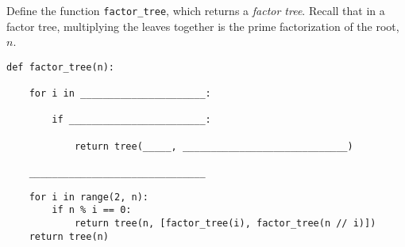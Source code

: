 \begin{blocksection}
\question Define the function \lstinline{factor_tree}, which returns a \emph{factor tree}. Recall that in a factor tree, multiplying the leaves together is the prime factorization of the root, $n$. \\

\begin{lstlisting}
def factor_tree(n):

    for i in ______________________:

        if ________________________:

            return tree(_____, _____________________________)

    _______________________________
\end{lstlisting}

\begin{solution}[0.5in]
\begin{lstlisting}
    for i in range(2, n):
        if n % i == 0:
            return tree(n, [factor_tree(i), factor_tree(n // i)])
    return tree(n)
\end{lstlisting}
\end{solution}
\end{blocksection}
